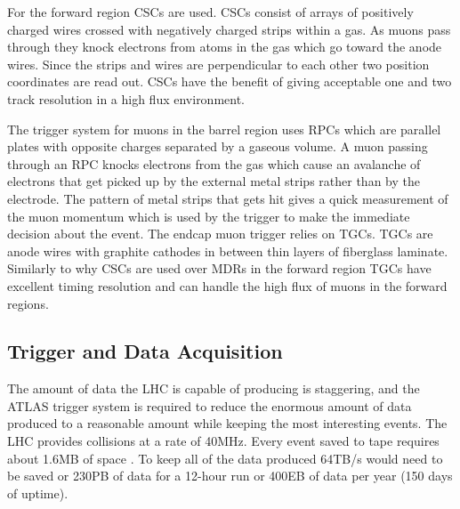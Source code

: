 For the forward region CSCs are used.  CSCs consist of arrays of positively charged wires crossed with negatively charged strips within a gas.  As muons pass through they knock electrons from atoms in the gas which go toward the anode wires. Since the strips and wires are perpendicular to each other two position coordinates are read out.  CSCs have the benefit of giving acceptable one and two track resolution in a high flux environment.

The trigger system for muons in the barrel region uses RPCs which are parallel plates with opposite charges separated by a gaseous volume. A muon passing through an RPC knocks electrons from the gas which cause an avalanche of electrons that get picked up by the external metal strips rather than by the electrode.  The pattern of metal strips that gets hit gives a quick measurement of the muon momentum which is used by the trigger to make the immediate decision about the event.
The endcap muon trigger relies on TGCs.  TGCs are anode wires with graphite cathodes in between thin layers of fiberglass laminate.  Similarly to why CSCs are used over MDRs in the forward region TGCs have excellent timing resolution and can handle the high flux of muons in the forward regions.


\subsection{Trigger and Data Acquisition}
\label{sec:TDAQ}
The amount of data the LHC is capable of producing is staggering, and the ATLAS trigger system is required to reduce the enormous amount of data produced to a reasonable amount while keeping the most interesting events.  The LHC provides collisions at a rate of 40MHz.  Every event saved to tape requires about 1.6MB of space \cite{Outreach:1457044}. To keep all of the data produced 64TB/s would need to be saved or 230PB of data for a 12-hour run or 400EB of data per year (150 days of uptime). 

